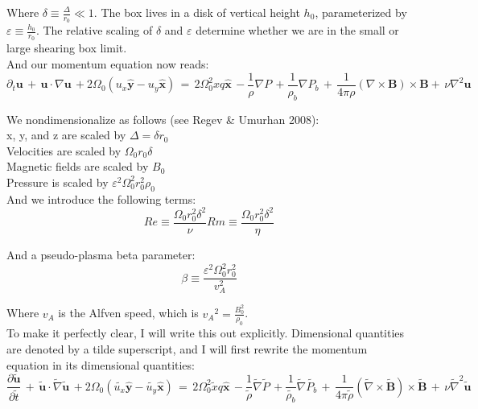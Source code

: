 \documentclass[letterpaper,12pt]{article}
\newcommand\reye{\mathrel{Re}}
\newcommand\reym{\mathrel{Rm}}
\begin{document}
Where $\delta \equiv \frac{\Delta}{r_0} \ll 1 $. The box lives in a disk of vertical height $h_0$, parameterized by $\varepsilon \equiv \frac{h_0}{r_0}$. The relative scaling of $\delta$ and $\varepsilon$ determine whether we are in the small or large shearing box limit.\\

And our momentum equation now reads: 
\[\partial_t \mathbf{u} \, + \, \mathbf{u} \cdot \nabla \mathbf{u} \, + 2\Omega_0\left(u_x \mathbf{\hat{y}} - u_{y}\mathbf{\hat{x}}\right) \, = \, 2\Omega_0^2 x q \mathbf{\hat{x}} \, -\frac{1}{\rho}\nabla P \, +\frac{1}{\rho_b}\nabla P_b \,  + \, \frac{1}{4 \pi \rho} \left( \nabla \times \mathbf{B} \right) \times \mathbf{B} + \, \nu\nabla^2 \mathbf{u} \,\]

\noindent We nondimensionalize as follows (see Regev \& Umurhan 2008): \\

\noindent x, y, and z are scaled by $\Delta = \delta r_0$ \\
Velocities are scaled by $\Omega_0 r_0 \delta$ \\
Magnetic fields are scaled by $B_0$ \\
Pressure is scaled by $\varepsilon^2 \Omega_0^2 r_0^2 \rho_0$ \\ 

And we introduce the following terms:
\[\reye \equiv \frac{\Omega_0 r_0^2 \delta^2}{\nu} \reym \equiv \frac{\Omega_0 r_0^2 \delta^2}{\eta}\]

And a pseudo-plasma beta parameter: 
\[\beta \equiv \frac{\varepsilon^2\Omega_0^2r_0^2}{v_A^2} \]

Where $v_A$ is the Alfven speed, which is ${v_A}^2 = \frac{B_0^2}{\rho_0}$. \\

To make it perfectly clear, I will write this out explicitly. Dimensional quantities are denoted by a tilde superscript, and I will first rewrite the momentum equation in its dimensional quantities: \\

\[\frac{\partial \mathbf{\widetilde{u}}}{\partial \widetilde{t}} \, + \, \mathbf{\widetilde{u}} \cdot \widetilde{\nabla} \mathbf{\widetilde{u}} \, + 2\Omega_0\left(\widetilde{u_x} \mathbf{\hat{y}} - \widetilde{u_{y}}\mathbf{\hat{x}}\right) \, = \, 2\Omega_0^2 \widetilde{x} q \mathbf{\hat{x}} \, -\frac{1}{\widetilde{\rho}}\widetilde{\nabla} \widetilde{P} \, +\frac{1}{\widetilde{\rho_b}}\widetilde{\nabla} \widetilde{P_b} \,  + \, \frac{1}{4 \pi \widetilde{\rho}} \left( \widetilde{\nabla} \times \mathbf{\widetilde{B}} \right) \times \mathbf{\widetilde{B}}  \, + \, \nu \widetilde{\nabla}^2 \mathbf{\widetilde{u}} \,\]
\end{document}
